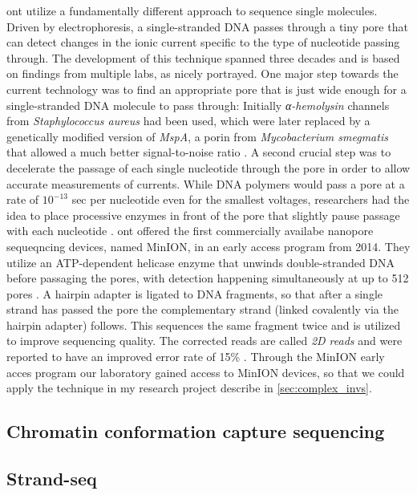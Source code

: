 \Acl{ont} utilize a fundamentally different approach to sequence single
molecules. Driven by electrophoresis, a single-stranded DNA passes through a
tiny pore that can detect changes in the ionic current specific to the type of
nucleotide passing through. The development of this technique spanned three
decades and is based on findings from multiple labs, as \cite{Deamer2016}
nicely portrayed. One major step towards the current technology was to find an
appropriate pore that is just wide enough for a single-stranded DNA molecule to
pass through: Initially \textit{α-hemolysin} channels from
\textit{Staphylococcus aureus} had been used, which were later replaced by a
genetically modified version of \textit{MspA}, a porin from
\textit{Mycobacterium smegmatis} that allowed a much better signal-to-noise
ratio \citep{Butler2008}. A second crucial step was to decelerate the passage of
each single nucleotide through the pore in order to allow accurate measurements
of currents. While DNA polymers would pass a pore at a rate of $10^{-13}$ sec
per nucleotide even for the smallest voltages, researchers had the idea to place
processive enzymes in front of the pore that slightly pause passage with each
nucleotide \citep{Deamer2016}. \Ac{ont} offered the first commercially availabe
nanopore sequeqncing devices, named MinION, in an early access program from 2014.
They utilize an ATP-dependent helicase enzyme that unwinds double-stranded DNA
before passaging the pores, with detection happening simultaneously at up to
512 pores \citep{Jain2015}. A hairpin adapter is ligated to DNA fragments, so
that after a single strand has passed the pore the complementary strand
(linked covalently via the hairpin adapter) follows. This sequences the same
fragment twice and is utilized to improve sequencing quality. The corrected reads
are called \emph{2D reads} and were reported to have an improved error rate of
15\% \citep{Jain2015}. Through the MinION early acces program our laboratory
gained access to MinION devices, so that we could apply the technique in my
research project describe in \cref{sec:complex_invs}.





\subsection{Chromatin conformation capture sequencing}
\label{sec:ccc}


\subsection{Strand-seq}
\label{sec:strandseq}

